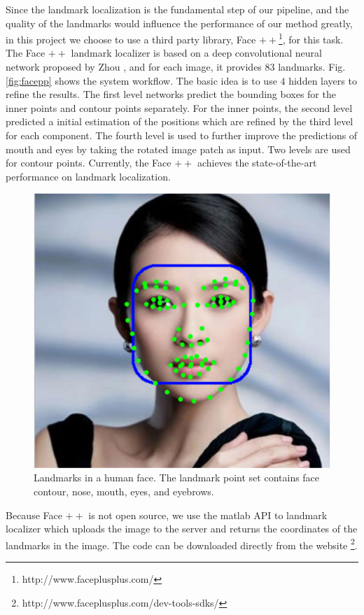\documentclass[10pt,twocolumn,letterpaper]{article}
\begin{document}
Since the landmark localization is the fundamental step of our pipeline, and the quality of the landmarks would influence the performance of our method greatly, in this project we choose to use a third party library, Face $++$\footnote[1]{http://www.faceplusplus.com/}, for this task. The Face $++$ landmark localizer is based on a deep convolutional neural network proposed by Zhou \etal \cite{zhou2013extensive}, and for each image, it provides $83$ landmarks. Fig. \ref{fig:facepp} shows the system workflow. The basic idea is to use $4$ hidden layers to refine the results.  The first level networks predict the bounding boxes for the inner points and contour points separately. For the inner points, the second level predicted a initial estimation of the positions which are refined by the third level for each component. The fourth level is used to further improve the predictions of mouth and eyes by taking the rotated image patch as input. Two levels are used
for contour points. Currently, the Face $++$ achieves the state-of-the-art performance on landmark localization.

\begin{figure}[t]
\begin{center}
   \includegraphics[width=0.8\linewidth]{fig/landmark.png}
\end{center}
   \caption{Landmarks in a human face. The landmark point set contains face contour, nose, mouth, eyes, and eyebrows.}
\label{fig:landmark}
\end{figure}

Because Face $++$ is not open source, we use the matlab API to landmark localizer which uploads the image to the server and returns the coordinates of the landmarks in the image. The code
can be downloaded directly from the website \footnote[2]{http://www.faceplusplus.com/dev-tools-sdks/}.
\end{document}
